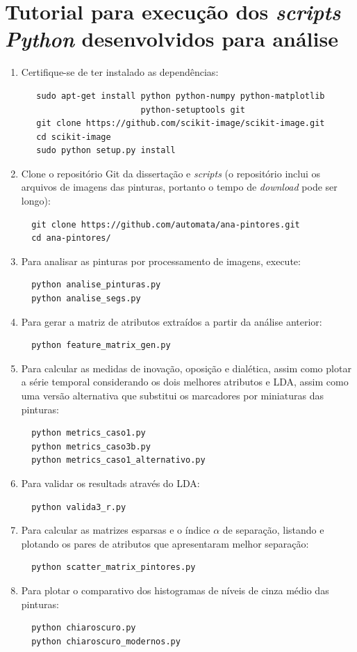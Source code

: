 \chapter{Tutorial para execução dos \textit{scripts Python} desenvolvidos para análise}
\label{cap:ap-tutorial}

\begin{enumerate}
  \item Certifique-se de ter instalado as dependências:
\begin{verbatim}
   sudo apt-get install python python-numpy python-matplotlib
                        python-setuptools git
   git clone https://github.com/scikit-image/scikit-image.git
   cd scikit-image
   sudo python setup.py install
\end{verbatim}
  \item Clone o repositório Git da dissertação e \textit{scripts} (o repositório
    inclui os arquivos de imagens das pinturas, portanto o tempo de
    \textit{download} pode ser longo):
\begin{verbatim}
  git clone https://github.com/automata/ana-pintores.git
  cd ana-pintores/
\end{verbatim}
  \item Para analisar as pinturas por processamento de imagens, execute:
\begin{verbatim}
  python analise_pinturas.py
  python analise_segs.py
\end{verbatim}
  \item Para gerar a matriz de atributos extraídos a partir da análise anterior:
\begin{verbatim}
  python feature_matrix_gen.py
\end{verbatim}
  \item Para calcular as medidas de inovação, oposição e dialética, assim como
    plotar a série temporal considerando os dois melhores atributos e LDA, assim
    como uma versão alternativa que substitui os marcadores por miniaturas das
    pinturas:
\begin{verbatim}
  python metrics_caso1.py
  python metrics_caso3b.py
  python metrics_caso1_alternativo.py
\end{verbatim}
  \item Para validar os resultads através do LDA:
\begin{verbatim}
  python valida3_r.py
\end{verbatim}
  \item Para calcular as matrizes esparsas e o índice $\alpha$ de separação,
    listando e plotando os pares de atributos que apresentaram melhor separação: 
\begin{verbatim}
  python scatter_matrix_pintores.py
\end{verbatim}
  \item Para plotar o comparativo dos histogramas de níveis de cinza médio das pinturas:
\begin{verbatim}
  python chiaroscuro.py
  python chiaroscuro_modernos.py
\end{verbatim}
\end{enumerate}


